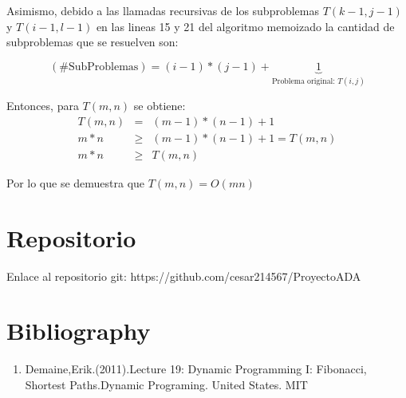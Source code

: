 \documentclass{article}
\begin{document}
Asimismo, debido a las llamadas recursivas de los subproblemas $T(k-1,j-1)$ y $T(i-1,l-1)$ en las lineas 15 y 21 del algoritmo memoizado la cantidad de subproblemas que se resuelven son:

$$(\text{\# SubProblemas}) = (i-1)*(j-1)+\underbrace{1}_{\text{Problema original: } T(i,j)}$$

Entonces, para $T(m,n)$ se obtiene:
\begin{eqnarray*}
T(m,n) &=& (m-1)*(n-1)+1 \\
m*n &\geq& (m-1)*(n-1)+1 = T(m,n) \\
m*n &\geq& T(m,n)
\end{eqnarray*}

Por lo que se demuestra que $T(m,n)=O(mn)$

\section{Repositorio}
Enlace al repositorio git:
https://github.com/cesar214567/ProyectoADA 

\section{Bibliography}
\begin{enumerate}
    \item Demaine,Erik.(2011).Lecture 19: Dynamic Programming I: Fibonacci, Shortest Paths.Dynamic Programing. United States. MIT
\end{enumerate}
\end{document}

